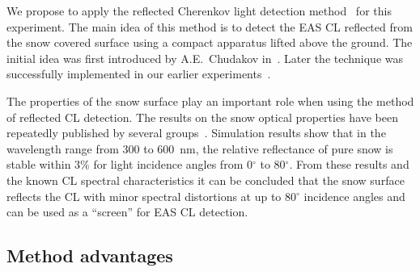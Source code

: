 \documentclass[a4paper,11pt]{article}
\begin{document}
We propose to apply the reflected Cherenkov light detection method~\cite{Ant15a} for this experiment. The main idea of this method is to detect the EAS CL reflected from the snow covered surface using a compact apparatus lifted above the ground. The initial idea was first introduced by A.E.~Chudakov in~\cite{Chu74}. Later the technique was successfully implemented in our earlier experiments~\cite{Ant15a, Ant15c}.

The properties of the snow surface play an important role when using the method of reflected CL detection. The results on the snow optical properties have been repeatedly published by several groups~\cite{qun83, dum10,gre94,war82,hud06}. Simulation results show that in the wavelength range from 300 to 600~nm, the relative reflectance of pure snow is stable within 3\% for light incidence angles from 0$^\circ$ to 80$^\circ$. From these results and the known CL spectral characteristics it can be concluded that the snow surface reflects the CL with minor spectral distortions at up to 80$^\circ$ incidence angles and can be used as a ``screen'' for EAS CL detection.

\subsection{Method advantages}
\end{document}
